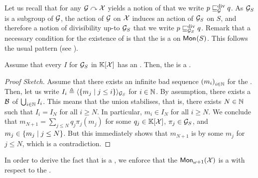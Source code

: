 \AP Let us recall that for any  $\group \actson \X$ yields a
notion of  that we write $p \gdivleq[\group]
q$. As $\group_S$ is a subgroup of $\group$, the action of $\group$ on $\X$
induces an action of $\group_S$ on $S$, and therefore a notion of divisibility
up-to $\group_S$ that we write $p \gdivleq[\group_S] q$. Remark that a
necessary condition for the existence of  is
that the  is a  on
$\mon{S}$. This follows the usual pattern (see \cite{GHOLAS24}). 

\begin{lemma}
    \label{lem:wqo-needed-g-s}
    Assume that every  $I$
    for $\group_S$ in $\poly{\K}{\X}$
    has an .
    Then, the  is a .
\end{lemma}
\begin{proof}[Proof Sketch]
    Assume that there exists an infinite bad sequence 
    $\seqof{m_i}[i \in \N]$ for the .
    Then, let us write $I_i \defined \gen{\setof{m_j}{j \leq i}}{\group_S}$
    for $i \in \N$. By assumption, there exists a 
    $\Basis$ of $\bigcup_{i \in \N} I_i$. This means that
    the union stabilises, that is, there exists $N \in \N$ such that
    $I_i = I_N$ for all $i \geq N$. 
    In particular, $m_i \in I_N$ for all $i \geq N$.
    We conclude that $m_{N+1} = \sum_{j \leq N} q_j \pi_j(m_j)$ for some 
    $q_j \in \poly{\K}{\X}$,
    $\pi_j \in \group_S$, and $m_j \in \setof{m_j}{j \leq N}$.
    But this immediately shows that $m_{N+1}$ is  by some $m_j$ for $j \leq N$, which is a contradiction.
\end{proof}

In order to derive the fact that  is a
, we enforce that the $\mon[\omega+1]{\X}$ is a
 with respect to the .

